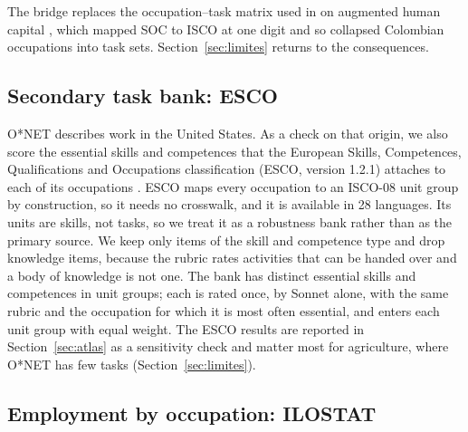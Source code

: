 The bridge replaces the occupation--task matrix used in \trabajoprevio on augmented human capital \citeahc, which mapped SOC to ISCO at one digit and so collapsed  Colombian occupations into  task sets.
Section~\ref{sec:limites} returns to the consequences.

\subsection{Secondary task bank: ESCO}

O*NET describes work in the United States.
As a check on that origin, we also score the essential skills and competences that the European Skills, Competences, Qualifications and Occupations classification (ESCO, version 1.2.1) attaches to each of its occupations \citep{esco2026}.
ESCO maps every occupation to an ISCO-08 unit group by construction, so it needs no crosswalk, and it is available in 28 languages.
Its units are skills, not tasks, so we treat it as a robustness bank rather than as the primary source.
We keep only items of the skill and competence type and drop knowledge items, because the rubric rates activities that can be handed over and a body of knowledge is not one.
The bank has  distinct essential skills and competences in  unit groups; each is rated once, by Sonnet alone, with the same rubric and the occupation for which it is most often essential, and enters each unit group with equal weight.
The ESCO results are reported in Section~\ref{sec:atlas} as a sensitivity check and matter most for agriculture, where O*NET has few tasks (Section~\ref{sec:limites}).

\subsection{Employment by occupation: ILOSTAT}


